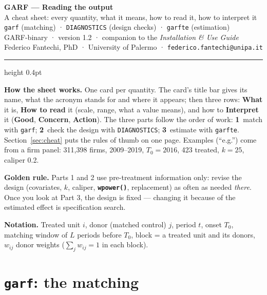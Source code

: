 \documentclass[10pt,a4paper]{article}
\newcommand{\code}[1]{\texttt{#1}}
\newcommand{\opt}[1]{\texttt{\textbf{#1}}}
\newcommand{\good}{\textcolor{good}{\textbf{Good}}}
\newcommand{\bad}{\textcolor{bad}{\textbf{Concern}}}
\newcommand{\act}{\textbf{Action}}
\begin{document}
\thispagestyle{empty}
\begin{center}
{\LARGE\bfseries\color{ink} GARF — Reading the output}\\[0.35em]
{\large\color{accent} A cheat sheet: every quantity, what it means, how to read it, how to interpret it}\\[0.6em]
{\normalsize \texttt{garf} (matching) \;·\; \texttt{DIAGNOSTICS} (design checks) \;·\; \texttt{garfte} (estimation)}\\[0.3em]
{\color{cmt}\small GARF-binary · version 1.2 · companion to the \emph{Installation \& Use Guide}}\\[0.5em]
{\small Federico Fantechi, PhD · University of Palermo · \texttt{federico.fantechi@unipa.it}}
\end{center}
\vspace{0.2em}
\hrule height 0.4pt
\vspace{0.5em}

\noindent\textbf{How the sheet works.} One card per quantity. The card's title bar gives its name,
what the acronym stands for and where it appears; then three rows: \textbf{What} it is, \textbf{How to
read} it (scale, range, what a value means), and how to \textbf{Interpret} it (\good, \bad, \act).
The three parts follow the order of work: \textbf{1}~match with \code{garf}; \textbf{2}~check the design
with \code{DIAGNOSTICS}; \textbf{3}~estimate with \code{garfte}. Section~\ref{sec:cheat} puts the
rules of thumb on one page. Examples (``e.g.'') come from a firm panel: 311{,}398 firms, 2009--2019,
$T_0=2016$, 423 treated, $k=25$, caliper 0.2.

\noindent\textbf{Golden rule.} Parts 1 and 2 use pre-treatment information only: revise the design
(covariates, $k$, caliper, \opt{wpower()}, replacement) as often as needed \emph{there}. Once you look
at Part 3, the design is fixed --- changing it because of the estimated effect is specification search.

\noindent\textbf{Notation.} Treated unit $i$, donor (matched control) $j$, period $t$, onset $T_0$,
matching window of $L$ periods before $T_0$, block = a treated unit and its donors, $w_{ij}$ donor
weights ($\sum_j w_{ij}=1$ in each block).

\vspace{-0.4em}
\tableofcontents

\section{\texttt{garf}: the matching}\label{sec:garf}
\end{document}
